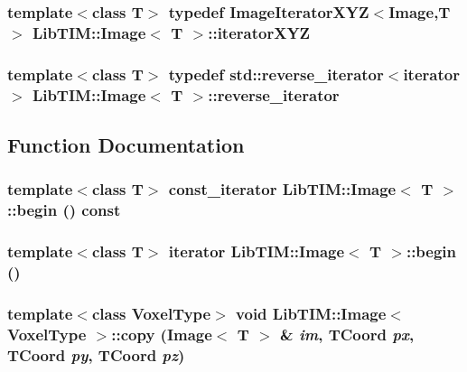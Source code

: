 \subsubsection{\setlength{\rightskip}{0pt plus 5cm}template$<$class T$>$ typedef Image\-Iterator\-XYZ$<$Image,T$>$ {\bf Lib\-TIM::Image}$<$ T $>$::iterator\-XYZ\hspace{0.3cm}{\tt  [inherited]}}\label{group__Image_ga5}


\subsubsection{\setlength{\rightskip}{0pt plus 5cm}template$<$class T$>$ typedef std::reverse\_\-iterator$<$iterator$>$ {\bf Lib\-TIM::Image}$<$ T $>$::reverse\_\-iterator\hspace{0.3cm}{\tt  [inherited]}}\label{group__Image_ga8}




\subsection{Function Documentation}
\subsubsection{\setlength{\rightskip}{0pt plus 5cm}template$<$class T$>$ const\_\-iterator {\bf Lib\-TIM::Image}$<$ T $>$::begin () const\hspace{0.3cm}{\tt  [inline, inherited]}}\label{group__Image_ga34}


\subsubsection{\setlength{\rightskip}{0pt plus 5cm}template$<$class T$>$ iterator {\bf Lib\-TIM::Image}$<$ T $>$::begin ()\hspace{0.3cm}{\tt  [inline, inherited]}}\label{group__Image_ga33}


\subsubsection{\setlength{\rightskip}{0pt plus 5cm}template$<$class Voxel\-Type$>$ void {\bf Lib\-TIM::Image}$<$ Voxel\-Type $>$::copy ({\bf Image}$<$ T $>$ \& {\em im}, {\bf TCoord} {\em px}, {\bf TCoord} {\em py}, {\bf TCoord} {\em pz})\hspace{0.3cm}{\tt  [inherited]}}\label{group__Image_ga63}


